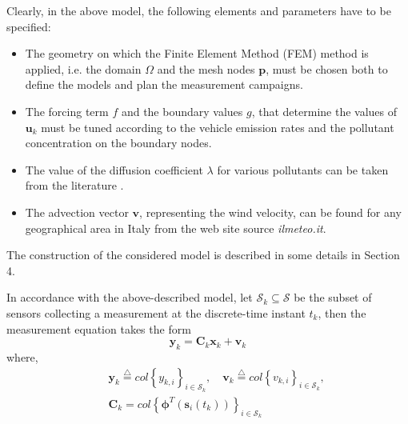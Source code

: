 \documentclass[journal]{IEEEtran}
\newcommand{\defi} { \stackrel{\bigtriangleup}{=} }
\newcommand{\mb}{\mathbf}
\newcommand{\bs}{\boldsymbol}
\begin{document}
	Clearly, in the above model, the following elements and parameters have to be specified:
	\begin{itemize}
	\item The geometry on which the Finite Element Method (FEM) method is applied, i.e. the domain $\Omega$ and the mesh nodes $\textbf{p}$, must be chosen both to define the models 
	and plan the measurement 		campaigns.
	\item The forcing term $f$ and the boundary values $g$, that determine the values of $\textbf{u}_k$  must be tuned according to the vehicle emission rates 
	and the pollutant concentration on the boundary nodes.
	\item The value of the diffusion coefficient $\lambda$ for various pollutants can be taken from the literature \cite{Massman_001}.
	\item The advection vector $\mb{v}$, representing the wind velocity, can be found for any geographical area in Italy from the web site source \textit{ilmeteo.it}.
	\end{itemize}
	The construction of the considered model is described in some details in Section 4.
	
	In accordance with the above-described model, let $\mathcal S_k \subseteq \mathcal S $ be the subset of sensors collecting a measurement at the discrete-time instant
	$t_k$, then the measurement equation takes the form
	\begin{equation}\label{eq:y}
	\mb {y}_k = \mb{C}_k \mb{x}_k + \mb{v}_k
	\end{equation}
	where, 
	\begin{eqnarray*}
	&&\mb{y}_k \defi col \left\{ y_{k,i} \right\}_{i\in \mathcal{S}_k},  \quad \mb{v}_k \defi col \left\{ v_{k,i} \right\}_{i \in \mathcal{S}_k}, \\
	&& \mb{C}_k = col \left\{ \bs{\phi}^T(\mb{s}_i (t_k)) \right\}_{i \in \mathcal{S}_k}
	\end{eqnarray*}
	
\end{document}
